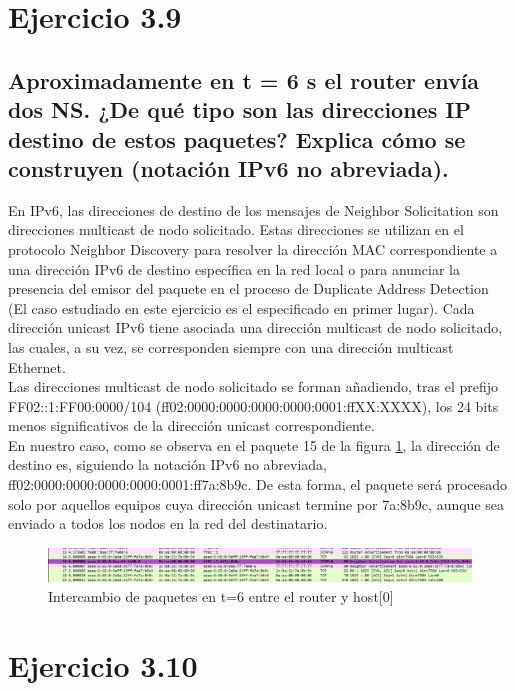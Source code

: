 \section{Ejercicio 3.9}
\subsection{ Aproximadamente en t = 6 s el router envía dos NS. ¿De qué tipo son las direcciones IP destino de estos
paquetes? Explica cómo se construyen (notación IPv6 no abreviada).}

En IPv6, las direcciones de destino de los mensajes de Neighbor Solicitation son direcciones multicast de nodo solicitado. Estas direcciones se utilizan en el protocolo Neighbor Discovery para resolver la dirección MAC correspondiente a una dirección IPv6 de destino específica en la red local o para anunciar la presencia del emisor del paquete en el proceso de Duplicate Address Detection (El caso estudiado en este ejercicio es el especificado en primer lugar). Cada dirección unicast IPv6 tiene asociada una dirección multicast de nodo solicitado, las cuales, a su vez, se corresponden siempre con una dirección multicast Ethernet.\\
Las direcciones multicast de nodo solicitado se forman añadiendo, tras el prefijo \\
FF02::1:FF00:0000/104 (ff02:0000:0000:0000:0000:0001:ffXX:XXXX), los 24 bits menos significativos de la dirección unicast correspondiente. \\
En nuestro caso, como se observa en el paquete 15 de la figura \ref{fig:ns_from_router_to_host0}, la dirección de destino es, siguiendo la notación IPv6 no abreviada, 
ff02:0000:0000:0000:0000:0001:ff7a:8b9c. De esta forma, el paquete será procesado solo por aquellos equipos cuya dirección unicast termine por 7a:8b9c, aunque sea enviado a todos los nodos en la red del destinatario.

\begin{figure}[H]
    \centering
    \includegraphics[width=135mm, scale=0.75]{imaxes/ejercicio3_9_1.png}
    \caption{Intercambio de paquetes en t=6 entre el router y host[0]}
    \label{fig:ns_from_router_to_host0}
\end{figure}

\section{Ejercicio 3.10}
